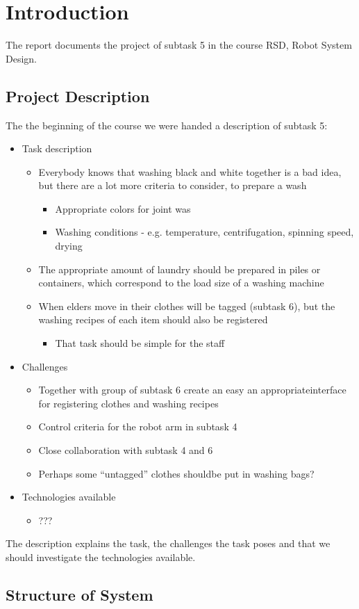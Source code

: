 \section{Introduction}

The report documents the project of subtask 5 in the course RSD, Robot System Design.

\subsection{Project Description}

The the beginning of the course we were handed a description of subtask 5:

\begin{itemize}
\item Task description
	\begin{itemize}
	\item Everybody knows that washing black and white together is a bad idea, but there are a lot more criteria to consider, to prepare a wash
		\begin{itemize}
		\item Appropriate colors for joint was
		\item Washing conditions - e.g. temperature, centrifugation, spinning speed, drying
		\end{itemize}
	\item The appropriate amount of laundry should be prepared in piles or containers, which correspond to the load size of a washing machine
	\item When elders move in their clothes will be tagged (subtask 6), but the washing recipes of each item should also be registered
		\begin{itemize}
		\item That task should be simple for the staff
		\end{itemize}
	\end{itemize}
\item Challenges
	\begin{itemize}
	\item Together with group of subtask 6 create an easy an appropriateinterface for registering clothes and washing recipes
	\item Control criteria for the robot arm in subtask 4
	\item Close collaboration with subtask 4 and 6
	\item Perhaps some “untagged” clothes shouldbe put in washing bags?
	\end{itemize}
\item Technologies available
	\begin{itemize}
	\item ???
	\end{itemize}
\end{itemize}

The description explains the task, the challenges the task poses and that we should investigate the technologies available.

\subsection{Structure of System}